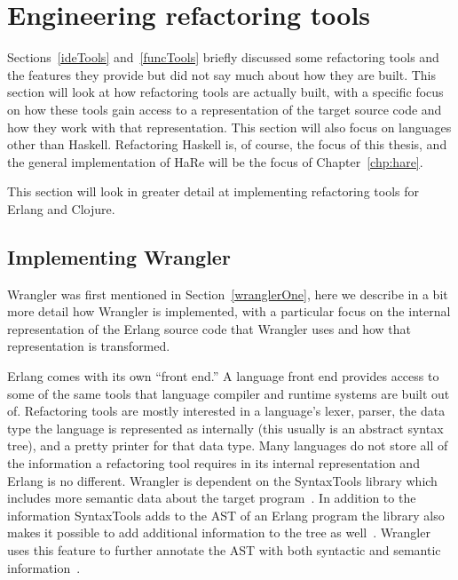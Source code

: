 \section{Engineering refactoring tools}\label{engineeringRefac}

Sections~\ref{ideTools} and~\ref{funcTools} briefly discussed some refactoring tools and the features they provide but did not say much about how they are built. This section will look at how refactoring tools are actually built, with a specific focus on how these tools gain access to a representation of the target source code and how they work with that representation. This section will also focus on languages other than Haskell. Refactoring Haskell is, of course, the focus of this thesis, and the general implementation of HaRe will be the focus of Chapter~\ref{chp:hare}.

This section will look in greater detail at implementing refactoring tools for Erlang and Clojure.

\subsection{Implementing Wrangler}

Wrangler was first mentioned in Section~\ref{wranglerOne}, here we describe in a bit more detail how Wrangler is implemented, with a particular focus on the internal representation of the Erlang source code that Wrangler uses and how that representation is transformed. 

Erlang comes with its own ``front end.'' A language front end provides access to some of the same tools that language compiler and runtime systems are built out of. Refactoring tools are mostly interested in a language's lexer, parser, the data type the language is represented as internally (this usually is an abstract syntax tree), and a pretty printer for that data type. Many languages do not store all of the information a refactoring tool requires in its internal representation and Erlang is no different. Wrangler is dependent on the SyntaxTools library which includes more semantic data about the target program~\citep{wranglerUpdated}. In addition to the information SyntaxTools adds to the AST of an Erlang program the library also makes it possible to add additional information to the tree as well~\citep{syntaxTools}. Wrangler uses this feature to further annotate the AST with both syntactic and semantic information~\citep{wranglerUpdated}.  

